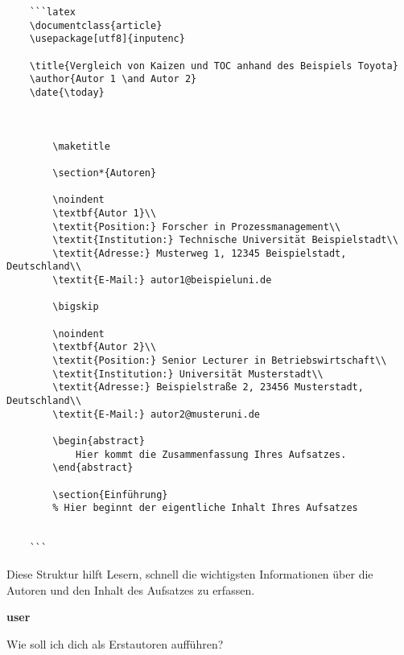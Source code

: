 \begin{verbatim}
	```latex
	\documentclass{article}
	\usepackage[utf8]{inputenc}
	
	\title{Vergleich von Kaizen und TOC anhand des Beispiels Toyota}
	\author{Autor 1 \and Autor 2}
	\date{\today}
	
	
		
		\maketitle
		
		\section*{Autoren}
		
		\noindent
		\textbf{Autor 1}\\
		\textit{Position:} Forscher in Prozessmanagement\\
		\textit{Institution:} Technische Universität Beispielstadt\\
		\textit{Adresse:} Musterweg 1, 12345 Beispielstadt, Deutschland\\
		\textit{E-Mail:} autor1@beispieluni.de
		
		\bigskip
		
		\noindent
		\textbf{Autor 2}\\
		\textit{Position:} Senior Lecturer in Betriebswirtschaft\\
		\textit{Institution:} Universität Musterstadt\\
		\textit{Adresse:} Beispielstraße 2, 23456 Musterstadt, Deutschland\\
		\textit{E-Mail:} autor2@musteruni.de
		
		\begin{abstract}
			Hier kommt die Zusammenfassung Ihres Aufsatzes.
		\end{abstract}
		
		\section{Einführung}
		% Hier beginnt der eigentliche Inhalt Ihres Aufsatzes
		
	
	```
\end{verbatim}

Diese Struktur hilft Lesern, schnell die wichtigsten Informationen über die Autoren und den Inhalt des Aufsatzes zu erfassen.

\textbf{user}

Wie soll ich dich als Erstautoren aufführen?


